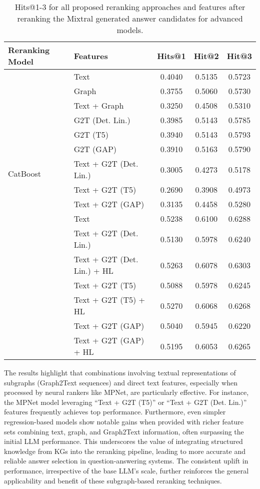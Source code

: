 \begin{table}[htbp]
    \caption{Hits@1-3 for all proposed reranking approaches and features after reranking the Mixtral generated answer candidates for advanced models.}
    \label{tab:controllable_fusion:mixtral_all_result2}
    \centering
    \begin{tabular}{l p{6cm} c c c}
        \toprule
        \textbf{Reranking Model} & \textbf{Features} & \textbf{Hits@1} & \textbf{Hit@2} & \textbf{Hit@3} \\
        \midrule
        \multirow{12}{*}{CatBoost} & Text & 0.4040 & 0.5135 & 0.5723 \\
        & Graph & 0.3755 & 0.5060 & 0.5730 \\
        & Text + Graph & 0.3250 & 0.4508 & 0.5310 \\
        & G2T (Det. Lin.) & 0.3985 & 0.5143 & 0.5785 \\
        & G2T (T5) & 0.3940 & 0.5143 & 0.5793 \\
        & G2T (GAP) & 0.3910 & 0.5163 & 0.5790 \\
        & Text + G2T (Det. Lin.) & 0.3005 & 0.4273 & 0.5178 \\
        & Text + G2T (T5) & 0.2690 & 0.3908 & 0.4973 \\
        & Text + G2T (GAP) & 0.3135 & 0.4458 & 0.5280 \\
        \midrule
        \multirow{10}{*}{MPNet} & Text & 0.5238 & 0.6100 & 0.6288 \\
        & Text + G2T (Det. Lin.) & 0.5130 & 0.5978 & 0.6240 \\
        & Text + G2T (Det. Lin.) + HL & 0.5263 & 0.6078 & 0.6303 \\
        & Text + G2T (T5) & 0.5088 & 0.5978 & 0.6245 \\
        & Text + G2T (T5) + HL & 0.5270 & 0.6068 & 0.6268 \\
        & Text + G2T (GAP) & 0.5040 & 0.5945 & 0.6220 \\
        & Text + G2T (GAP) + HL & 0.5195 & 0.6053 & 0.6265 \\
        \bottomrule
    \end{tabular}
\end{table}



The results highlight that combinations involving textual representations of subgraphs (Graph2Text sequences) and direct text features, especially when processed by neural rankers like MPNet, are particularly effective. For instance, the MPNet model leveraging ``Text + G2T (T5)'' or ``Text + G2T (Det. Lin.)'' features frequently achieves top performance. Furthermore, even simpler regression-based models show notable gains when provided with richer feature sets combining text, graph, and Graph2Text information, often surpassing the initial LLM performance. This underscores the value of integrating structured knowledge from KGs into the reranking pipeline, leading to more accurate and reliable answer selection in question-answering systems. The consistent uplift in performance, irrespective of the base LLM's scale, further reinforces the general applicability and benefit of these subgraph-based reranking techniques.

